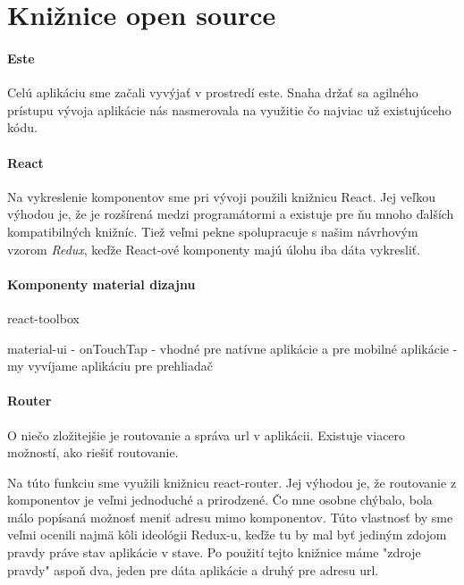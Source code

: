 \section{Knižnice open source}%

\paragraph{Este}
Celú aplikáciu sme začali vyvýjať v prostredí este. Snaha držať sa agilného prístupu vývoja aplikácie nás nasmerovala na využitie čo najviac už existujúceho kódu. %

 \cite[Este starter kit]{Este}

\paragraph{React}
Na vykreslenie komponentov sme pri vývoji použili knižnicu React. Jej veľkou výhodou je, že je rozšírená medzi programátormi a existuje pre ňu mnoho ďalších kompatibilných knižníc. Tiež veľmi pekne spolupracuje s našim návrhovým vzorom \emph{Redux}, keďže React-ové komponenty majú úlohu iba dáta vykresliť.

\paragraph{Komponenty material dizajnu}

react-toolbox

material-ui
- onTouchTap
- vhodné pre natívne aplikácie a pre mobilné aplikácie
- my vyvíjame aplikáciu pre prehliadač

\paragraph{Router}%
O niečo zložitejšie je routovanie a správa url v aplikácii. Existuje viacero možností, ako riešiť routovanie. 

Na túto funkciu sme využili knižnicu react-router. Jej výhodou je, že routovanie z komponentov je veľmi jednoduché a prirodzené. Čo mne osobne chýbalo, bola málo popísaná možnosť meniť adresu mimo komponentov. Túto vlastnosť by sme veľmi ocenili najmä kôli ideológii Redux-u, keďže tu by mal byť jediným zdojom pravdy práve stav aplikácie v stave. Po použití tejto knižnice máme "zdroje pravdy" aspoň dva, jeden pre dáta aplikácie a druhý pre adresu url. %

